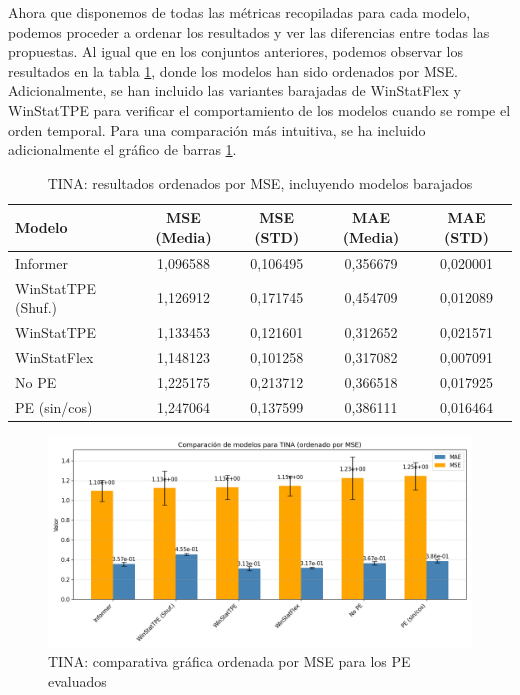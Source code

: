 Ahora que disponemos de todas las métricas recopiladas para cada modelo, podemos proceder a ordenar los resultados y ver las diferencias entre todas las propuestas. Al igual que en los conjuntos anteriores, podemos observar los resultados en la tabla \ref{tinafinal}, donde los modelos han sido ordenados por MSE. Adicionalmente, se han incluido las variantes barajadas de WinStatFlex y WinStatTPE para verificar el comportamiento de los modelos cuando se rompe el orden temporal. Para una comparación más intuitiva, se ha incluido adicionalmente el gráfico de barras \ref{tinafinal1}.

\begin{table}[h!]
	\centering
	\begin{tabular}{l|c|c|c|c}
		\toprule
		Modelo & MSE (Media) & MSE (STD) & MAE (Media) & MAE (STD) \\
		\midrule
		Informer & 1,096588 & 0,106495 & 0,356679 & 0,020001 \\
		WinStatTPE (Shuf.) & 1,126912 & 0,171745 & 0,454709 & 0,012089 \\
		WinStatTPE & 1,133453 & 0,121601 & 0,312652 & 0,021571 \\
		WinStatFlex & 1,148123 & 0,101258 & 0,317082 & 0,007091 \\
		No PE & 1,225175 & 0,213712 & 0,366518 & 0,017925 \\
		PE (sin/cos) & 1,247064 & 0,137599 & 0,386111 & 0,016464 \\
		\bottomrule
	\end{tabular}
	\caption{TINA: resultados ordenados por MSE, incluyendo modelos barajados}
	\label{tinafinal}
\end{table}

\begin{figure}[!ht]
	\centering
	\includegraphics[scale=0.45]{img/tinafinal1}
	\caption{TINA: comparativa gráfica ordenada por MSE para los PE evaluados}
	\label{tinafinal1}
\end{figure}


